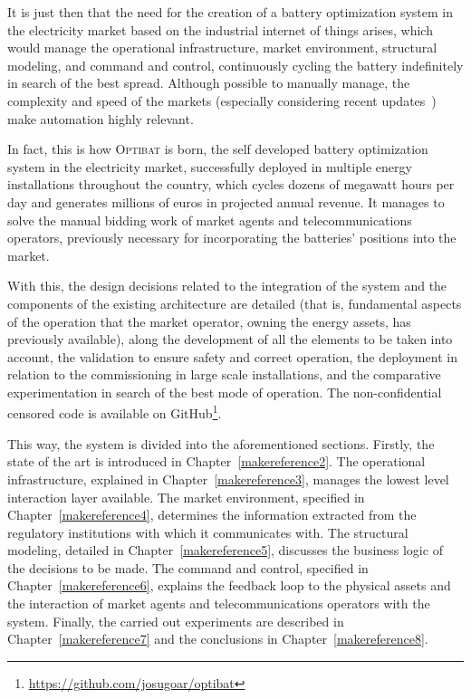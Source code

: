 It is just then that the need for the creation of a battery optimization system in the electricity market based on the industrial internet of things arises, which would manage the operational infrastructure, market environment, structural modeling, and command and control, continuously cycling the battery indefinitely in search of the best spread. Although possible to manually manage, the complexity and speed of the markets (especially considering recent updates~\cite{cnmc2025resolucion, omie2025instruccion}) make automation highly relevant.

In fact, this is how \textsc{Optibat} is born, the self developed battery optimization system in the electricity market, successfully deployed in multiple energy installations throughout the country, which cycles dozens of megawatt hours per day and generates millions of euros in projected annual revenue. It manages to solve the manual bidding work of market agents and telecommunications operators, previously necessary for incorporating the batteries' positions into the market.

With this, the design decisions related to the integration of the system and the components of the existing architecture are detailed (that is, fundamental aspects of the operation that the market operator, owning the energy assets, has previously available), along the development of all the elements to be taken into account, the validation to ensure safety and correct operation, the deployment in relation to the commissioning in large scale installations, and the comparative experimentation in search of the best mode of operation. The non-confidential censored code is available on GitHub\footnote{\url{https://github.com/josugoar/optibat}}.

This way, the system is divided into the aforementioned sections. Firstly, the state of the art is introduced in Chapter~\ref{makereference2}. The operational infrastructure, explained in Chapter~\ref{makereference3}, manages the lowest level interaction layer available. The market environment, specified in Chapter~\ref{makereference4}, determines the information extracted from the regulatory institutions with which it communicates with. The structural modeling, detailed in Chapter~\ref{makereference5}, discusses the business logic of the decisions to be made. The command and control, specified in Chapter~\ref{makereference6}, explains the feedback loop to the physical assets and the interaction of market agents and telecommunications operators with the system. Finally, the carried out experiments are described in Chapter~\ref{makereference7} and the conclusions in Chapter~\ref{makereference8}.


